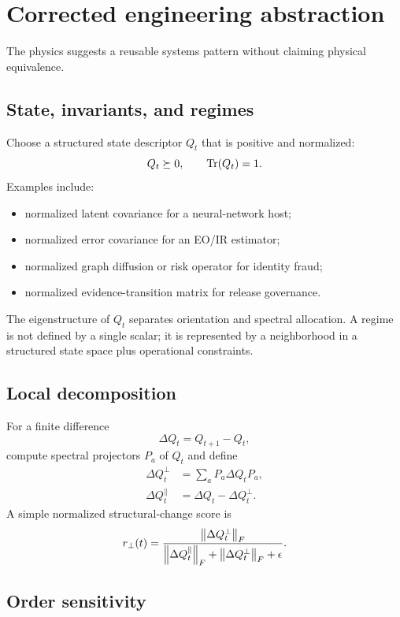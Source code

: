 \section{Corrected engineering abstraction}

The physics suggests a reusable systems pattern without claiming physical equivalence.

\subsection{State, invariants, and regimes}

Choose a structured state descriptor $Q_t$ that is positive and normalized:
\[
Q_t\succeq0,\qquad \operatorname{Tr}(Q_t)=1.
\]
Examples include:

\begin{itemize}
  \item normalized latent covariance for a neural-network host;
  \item normalized error covariance for an EO/IR estimator;
  \item normalized graph diffusion or risk operator for identity fraud;
  \item normalized evidence-transition matrix for release governance.
\end{itemize}

The eigenstructure of $Q_t$ separates orientation and spectral allocation. A regime is not defined by a single scalar; it is represented by a neighborhood in a structured state space plus operational constraints.

\subsection{Local decomposition}

For a finite difference
\[
\Delta Q_t=Q_{t+1}-Q_t,
\]
compute spectral projectors $P_a$ of $Q_t$ and define
\begin{align}
\Delta Q_t^{\perp}&=\sum_aP_a\Delta Q_tP_a,\\
\Delta Q_t^{\parallel}&=\Delta Q_t-\Delta Q_t^{\perp}.
\end{align}
A simple normalized structural-change score is
\begin{equation}
r_{\perp}(t)=\frac{\left\lVert \Delta Q_t^{\perp} \right\rVert_F}{\left\lVert \Delta Q_t^{\parallel} \right\rVert_F+\left\lVert \Delta Q_t^{\perp} \right\rVert_F+\epsilon}.
\label{eq:transverse_ratio}
\end{equation}

\subsection{Order sensitivity}

